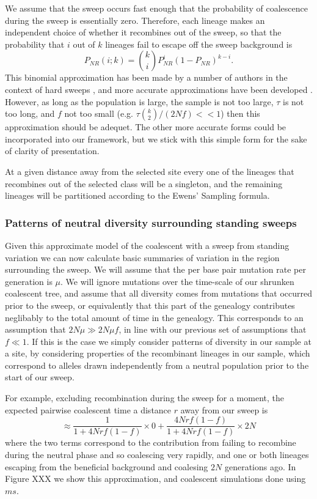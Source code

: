 \documentclass[a4paper,10pt]{article}
\begin{document}
We assume that the sweep occurs fast enough that the probability of coalescence during the sweep is essentially zero. Therefore, each lineage makes an independent choice of whether it recombines out of the sweep, so that the probability that $i$ out of $k$ lineages fail to escape off the sweep background is
\begin{equation}
P_{NR}(i;k) = {k \choose i} P_{NR}^{i} (1-P_{NR})^{k-i}.
\end{equation}
This binomial approximation has been made by a number of authors in the context of hard sweeps \citep{Barton}, and more accurate approximations have been developed \citep{}. However, as long as the population is large, the sample is not too large,  $\tau$ is not too long, and $f$ not too small (e.g. $\tau {k \choose 2}/(2Nf)<<1$) then this approximation should be adequet. The other more accurate forms could be incorporated into our framework, but we stick with this simple form for the sake of clarity of presentation.

At a given distance away from the selected site every one of the lineages that recombines out of the selected class will be a singleton, and the remaining lineages will be partitioned according to the Ewens' Sampling formula.  


\subsubsection{Patterns of neutral diversity surrounding standing sweeps}
Given this approximate model of the coalescent with a sweep from standing variation we can now calculate basic summaries of variation in the region surrounding the sweep. We will assume that the per base pair mutation rate per generation is $\mu$. We will ignore mutations over the time-scale of our shrunken coalescent tree, and assume that all diversity comes from mutations that occurred prior to the sweep, or equivalently that this part of the genealogy contributes neglibably to the total amount of time in the genealogy. This corresponds to an assumption that $2N\mu \gg 2N \mu f$, in line with our previous set of assumptions that $f \ll 1$. If this is the case we simply consider patterns of diversity in our sample at a site, by considering properties of the recombinant lineages in our sample, which correspond to alleles drawn independently from a neutral population prior to the start of our sweep.

For example, excluding recombination during the sweep for a moment, the expected pairwise coalescent time a distance $r$ away from our sweep is
\begin{equation}
\approx \frac{1}{1 + 4Nrf(1-f)} \times 0 + \frac{4Nrf(1-f)}{1 + 4Nrf(1-f)} \times 2N
\end{equation}
where the two terms correspond to the contribution from failing to recombine during the neutral phase and so coalescing very rapidly, and one or both lineages escaping from the beneficial background and coalesing $2N$ generations ago. In Figure XXX we show this approximation, and coalescent simulations done using $ms$. 
\end{document}
